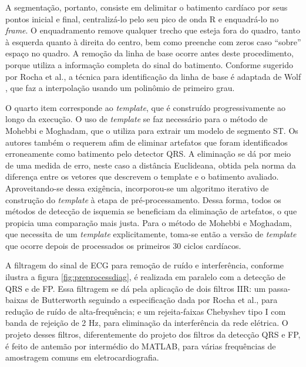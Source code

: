 A segmentação, portanto, consiste em delimitar o batimento cardíaco por seus pontos inicial e final, centralizá-lo pelo seu pico de onda R e enquadrá-lo no \emph{frame}. O enquadramento remove qualquer trecho que esteja fora do quadro, tanto à esquerda quanto à direita do centro, bem como preenche com zeros caso ``sobre'' espaço no quadro. A remoção da linha de base ocorre antes deste procedimento, porque utiliza a informação completa do sinal do batimento. Conforme sugerido por Rocha et al., a técnica para identificação da linha de base é adaptada de Wolf \cite{Wolf2004}, que faz a interpolação usando um polinômio de primeiro grau.

O quarto item corresponde ao \emph{template}, que é construído progressivamente ao longo da execução. O uso de \emph{template} se faz necessário para o método de Mohebbi e Moghadam, que o utiliza para extrair um modelo de segmento ST. Os autores também o requerem afim de eliminar artefatos que foram identificados erroneamente como batimento pelo detector QRS. A eliminação se dá por meio de uma medida de erro, neste caso a distância Euclideana, obtida pela norma da diferença entre os vetores que descrevem o template e o batimento avaliado. Aproveitando-se dessa exigência, incorporou-se um algoritmo iterativo de construção do \emph{template} à etapa de pré-processamento. Dessa forma, todos os métodos de detecção de isquemia se beneficiam da eliminação de artefatos, o que propicia uma comparação mais justa. Para o método de Mohebbi e Moghadam, que necessita de um \emph{template} explicitamente, toma-se então a versão de \emph{template} que ocorre depois de processados os primeiros 30 ciclos cardíacos.

A filtragem do sinal de ECG para remoção de ruído e interferência, conforme ilustra a figura \ref{fig:preprocessdiag}, é realizada em paralelo com a detecção de QRS e de FP. Essa filtragem se dá pela aplicação de dois filtros IIR: um passa-baixas de Butterworth seguindo a especificação dada por Rocha et al., para redução de ruído de alta-frequência; e um rejeita-faixas Chebyshev tipo I com banda de rejeição de 2 Hz, para eliminação da interferência da rede elétrica. O projeto desses filtros, diferentemente do projeto dos filtros da detecção QRS e FP, é feito de antemão por intermédio do MATLAB, para várias frequências de amostragem comuns em eletrocardiografia.

